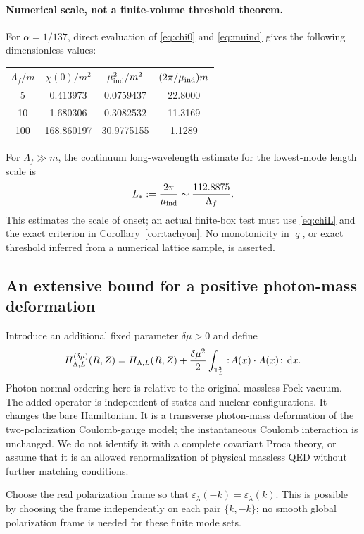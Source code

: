 \paragraph{Numerical scale, not a finite-volume threshold theorem.}
For \(\alpha=1/137\), direct evaluation of \eqref{eq:chi0} and
\eqref{eq:muind} gives the following dimensionless values:
\begin{center}
\begin{tabular}{@{}cccc@{}}
\toprule
\(\Lambda_f/m\) & \(\chi(0)/m^2\) & \(\mu_{\rm ind}^2/m^2\)
& \((2\pi/\mu_{\rm ind})m\)\\
\midrule
5   & 0.413973 & 0.0759437 & 22.8000\\
10  & 1.680306 & 0.3082532 & 11.3169\\
100 & 168.860197 & 30.9775155 & 1.1289\\
\bottomrule
\end{tabular}
\end{center}
For \(\Lambda_f\gg m\), the continuum long-wavelength estimate for the
lowest-mode length scale is
\[
 L_*:=\frac{2\pi}{\mu_{\rm ind}}
 \sim\frac{112.8875}{\Lambda_f}.
\]
This estimates the scale of onset; an actual finite-box test must use
\eqref{eq:chiL} and the exact criterion in Corollary~\ref{cor:tachyon}.
No monotonicity in \(|q|\), or exact threshold inferred from a numerical
lattice sample, is asserted.

\subsection{An extensive bound for a positive photon-mass deformation}

Introduce an additional fixed parameter \(\delta\mu>0\) and define
\begin{equation}
 H^{(\delta\mu)}_{\Lambda,L}(R,Z)
 =H_{\Lambda,L}(R,Z)
 +\frac{\delta\mu^2}{2}\int_{\mathbb T_L^3}:\!A(x)\cdot A(x)\!:\,\mathrm d x.
 \label{eq:Hct}
\end{equation}
Photon normal ordering here is relative to the original massless Fock
vacuum. The added operator is independent of states and nuclear
configurations. It changes the bare Hamiltonian. It is a transverse
photon-mass deformation of the two-polarization Coulomb-gauge model; the
instantaneous Coulomb interaction is unchanged. We do not identify it
with a complete covariant Proca theory, or assume that it is an allowed
renormalization of physical massless QED without further matching conditions.

Choose the real polarization frame so that
\(\varepsilon_\lambda(-k)=\varepsilon_\lambda(k)\). This is possible by
choosing the frame independently on each pair \(\{k,-k\}\); no smooth
global polarization frame is needed for these finite mode sets.

